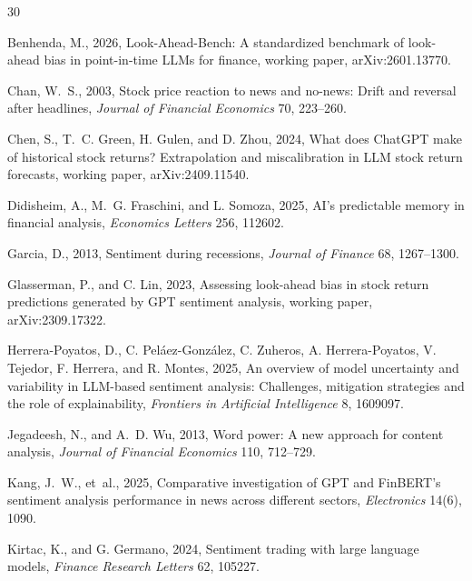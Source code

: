 \begin{thebibliography}{30}
\setlength{\bibsep}{3pt}
\small

Benhenda, M., 2026, {L}ook-{A}head-{B}ench: A standardized benchmark of look-ahead bias in point-in-time {LLM}s for finance, working paper, arXiv:2601.13770.

Chan, W.~S., 2003, Stock price reaction to news and no-news: {D}rift and reversal after headlines, \emph{Journal of Financial Economics} 70, 223--260.

Chen, S., T.~C. Green, H. Gulen, and D. Zhou, 2024, What does {ChatGPT} make of historical stock returns? {E}xtrapolation and miscalibration in {LLM} stock return forecasts, working paper, arXiv:2409.11540.

Didisheim, A., M.~G. Fraschini, and L. Somoza, 2025, {AI}'s predictable memory in financial analysis, \emph{Economics Letters} 256, 112602.

Garcia, D., 2013, Sentiment during recessions, \emph{Journal of Finance} 68, 1267--1300.

Glasserman, P., and C. Lin, 2023, Assessing look-ahead bias in stock return predictions generated by {GPT} sentiment analysis, working paper, arXiv:2309.17322.

Herrera-Poyatos, D., C. Pel\'aez-Gonz\'alez, C. Zuheros, A. Herrera-Poyatos, V. Tejedor, F. Herrera, and R. Montes, 2025, An overview of model uncertainty and variability in {LLM}-based sentiment analysis: {C}hallenges, mitigation strategies and the role of explainability, \emph{Frontiers in Artificial Intelligence} 8, 1609097.

Jegadeesh, N., and A.~D. Wu, 2013, Word power: {A} new approach for content analysis, \emph{Journal of Financial Economics} 110, 712--729.

Kang, J.~W., et~al., 2025, Comparative investigation of {GPT} and {FinBERT}'s sentiment analysis performance in news across different sectors, \emph{Electronics} 14(6), 1090.

Kirtac, K., and G. Germano, 2024, Sentiment trading with large language models, \emph{Finance Research Letters} 62, 105227.


\end{thebibliography}
